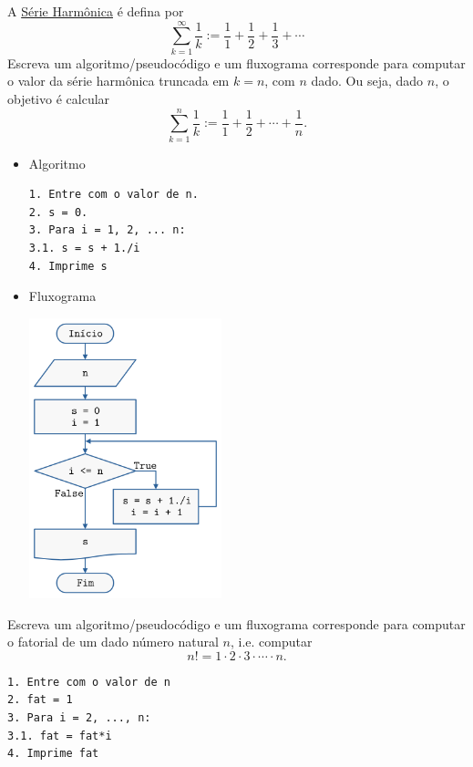 \begin{exer}
  A \href{https://pt.wikipedia.org/wiki/S%C3%A9rie_harm%C3%B3nica_(matem%C3%A1tica)}{Série Harmônica} é defina por
  \begin{equation}
    \sum_{k=1}^\infty\frac{1}{k} := \frac{1}{1} + \frac{1}{2} + \frac{1}{3} + \cdots
  \end{equation}
  Escreva um algoritmo/pseudocódigo e um fluxograma corresponde para computar o valor da série harmônica truncada em $k=n$, com $n$ dado. Ou seja, dado $n$, o objetivo é calcular
  \begin{equation}
    \sum_{k=1}^n\frac{1}{k} := \frac{1}{1} + \frac{1}{2} + \cdots + \frac{1}{n}.
  \end{equation}
\end{exer}
\begin{resp}
\begin{itemize}
  \item Algoritmo
  
\begin{verbatim}
1. Entre com o valor de n.
2. s = 0.
3. Para i = 1, 2, ... n:
3.1. s = s + 1./i
4. Imprime s
\end{verbatim}

  \item Fluxograma

  \includegraphics[width=2.2in]{./cap_lingua/dados/fig_resp_serieHarmonica/fig.png}

\end{itemize}
\end{resp}

\begin{exer}

  Escreva um algoritmo/pseudocódigo e um fluxograma corresponde para computar o fatorial de um dado número natural $n$, i.e. computar
  \begin{equation}
    n! = 1\cdot 2\cdot 3 \cdot \cdots \cdot n.
  \end{equation}
\end{exer}
\begin{resp}
  
\begin{verbatim}
1. Entre com o valor de n
2. fat = 1
3. Para i = 2, ..., n:
3.1. fat = fat*i
4. Imprime fat
\end{verbatim}

\end{resp}

